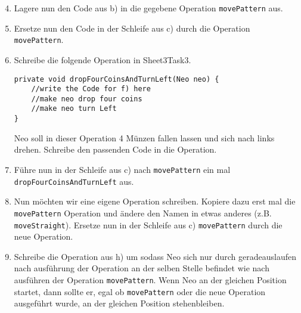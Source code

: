 \begin{enumerate}\setcounter{enumi}{3}
	\item 
		Lagere nun den Code aus b) in die gegebene Operation \lstinline{movePattern} aus.

	\item
		Ersetze nun den Code in der Schleife aus c) durch die Operation \lstinline{movePattern}.

	\item
		Schreibe die folgende Operation in Sheet3Task3.

		\begin{lstlisting}
private void dropFourCoinsAndTurnLeft(Neo neo) {
    //write the Code for f) here
    //make neo drop four coins
    //make neo turn Left
}
		\end{lstlisting}

		Neo soll in dieser Operation 4 Münzen fallen lassen und sich nach links drehen. 
		Schreibe den passenden Code in die Operation.

	\item
		Führe nun in der Schleife aus c) nach \lstinline{movePattern} ein mal \lstinline{dropFourCoinsAndTurnLeft} aus.

	\item
		Nun möchten wir eine eigene Operation schreiben. 
		Kopiere dazu erst mal die \lstinline{movePattern} Operation und ändere den Namen in etwas anderes (z.B. \lstinline{moveStraight}).
		Ersetze nun in der Schleife aus c) \lstinline{movePattern} durch die neue Operation.

	\item
		Schreibe die Operation aus h) um sodass Neo sich nur durch geradeauslaufen nach ausführung der Operation an der selben Stelle befindet wie nach ausführen der Operation \lstinline{movePattern}.
		Wenn Neo an der gleichen Position startet, dann sollte er, egal ob \lstinline{movePattern} oder die neue Operation ausgeführt wurde, an der gleichen Position stehenbleiben.
\end{enumerate}
\newpage
